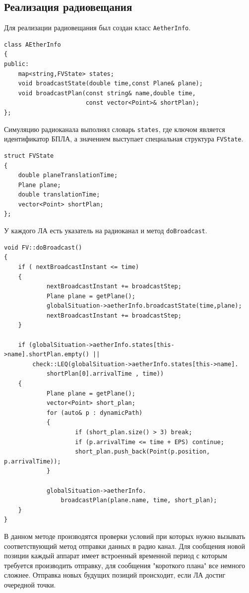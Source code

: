 \documentclass[a4paper,12pt]{article}
\numberwithin{figure}{subsubsection}
\begin{document}
\subsection{Реализация радиовещания}
Для реализации радиовещания был создан класс \texttt{AetherInfo}.
\begin{verbatim}
class AEtherInfo
{
public:
    map<string,FVState> states;
    void broadcastState(double time,const Plane& plane);
    void broadcastPlan(const string& name,double time,
                       const vector<Point>& shortPlan);
};
\end{verbatim}
Симуляцию радиоканала выполнял словарь \texttt{states}, где ключом является идентификатор БПЛА, а значением выступает специальная структура \texttt{FVState}.
\begin{verbatim}
struct FVState
{
    double planeTranslationTime;
    Plane plane;
    double translationTime;
    vector<Point> shortPlan;
};
\end{verbatim}
У каждого ЛА есть указатель на радиоканал и метод \texttt{doBroadcast}.
\begin{verbatim}
void FV::doBroadcast()
{
    if ( nextBroadcastInstant <= time)
    {
            nextBroadcastInstant += broadcastStep;
            Plane plane = getPlane();
            globalSituation->aetherInfo.broadcastState(time,plane);  
            nextBroadcastInstant += broadcastStep;
    }
    
    if (globalSituation->aetherInfo.states[this->name].shortPlan.empty() ||
        check::LEQ(globalSituation->aetherInfo.states[this->name].
            shortPlan[0].arrivalTime , time))
    {
            Plane plane = getPlane();
            vector<Point> short_plan;
            for (auto& p : dynamicPath)
            {
                    if (short_plan.size() > 3) break;
                    if (p.arrivalTime <= time + EPS) continue;
                    short_plan.push_back(Point(p.position, p.arrivalTime));
            }
        
            globalSituation->aetherInfo.
                broadcastPlan(plane.name, time, short_plan);
    }
}
\end{verbatim}
В данном методе производятся проверки условий при которых нужно вызывать соответствующий метод отправки данных в радио канал. Для сообщения новой позиции каждый аппарат имеет встроенный временной период с которым требуется производить отправку, для сообщения "короткого плана" все немного сложнее. Отправка новых будущих позиций происходит, если ЛА достиг очередной точки.
\end{document}
